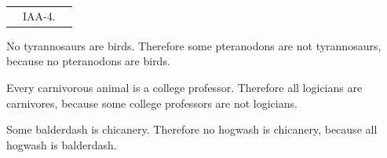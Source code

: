\begin{exercises}
{\begin{longtabu}{X[3,l,p]X[2,l,p]X[1,l,p]}
&

IAA-4. 
\end{longtabu}
}
                        
                                                                        
\item No tyrannosaurs are birds. Therefore some pteranodons are not tyrannosaurs, because no pteranodons are birds.  


\item Every carnivorous animal is a college professor. Therefore all logicians are carnivores, because some college professors are not logicians.
 

\item Some balderdash is chicanery. Therefore no hogwash is chicanery, because all hogwash is balderdash.  



\end{exercises}
